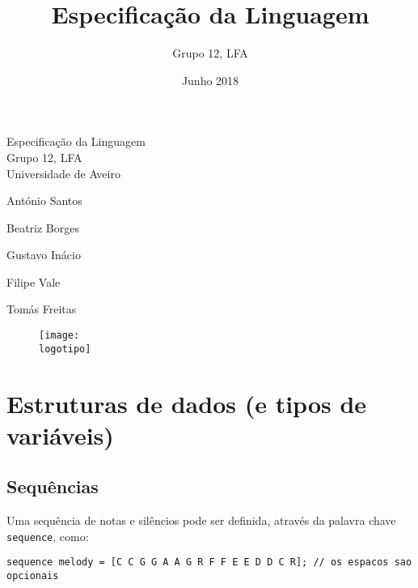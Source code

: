 \documentclass{article}
\title{Especificação da Linguagem}
\author{Grupo 12, LFA}
\date{Junho 2018}
\begin{document}
\def\titulo{Especificação da Linguagem}
\def\grupo{Grupo 12, LFA}
\def\empresa{Universidade de Aveiro}
\def\autores{António Santos\par Beatriz Borges\par Gustavo Inácio\par Filipe Vale\par Tomás Freitas\par}
\def\logotipo{ua.pdf}

\begin{titlepage}
\begin{center}
%
\vspace*{40mm}
%
{\Huge \titulo}\\ 
%
\vspace{8mm}
%
{\Large \grupo}\\
%
\vspace{2mm}
%
{\Large \empresa}\\
%
\vspace{10mm}
%
{\LARGE \autores}
%
\vspace{30mm}
%
\begin{figure}[h]
\center
\texttt{[image: \\logotipo]}
\end{figure}
%
\vspace{30mm}
\end{center}
\end{titlepage}



\maketitle

\tableofcontents
\clearpage

\section{Estruturas de dados (e tipos de variáveis)} \label{variables}
\subsection{Sequências}
Uma sequência de notas e silêncios pode ser definida, através da palavra chave \texttt{sequence}, como:
\begin{lstlisting} 
sequence melody = [C C G G A A G R F F E E D D C R]; // os espacos sao opcionais
\end{lstlisting}
\end{document}
